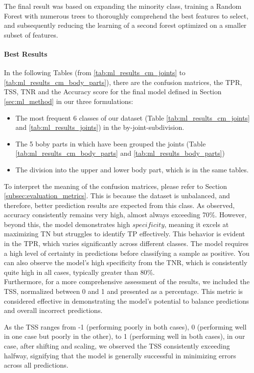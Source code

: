 The final result was based on expanding the minority class, training a Random Forest with numerous trees to thoroughly comprehend the best features to select, and subsequently reducing the learning of a second forest optimized on a smaller subset of features.

\paragraph{Best Results}
In the following Tables (from \ref{tab:ml_results_cm_joints} to \ref{tab:ml_results_cm_body_parts}), there are the confusion matrices, the TPR, TSS, TNR and the Accuracy score for the final model defined in Section \ref{sec:ml_method} in our three formulations:
\begin{itemize}
  \item The most frequent 6 classes of our dataset (Table \ref{tab:ml_results_cm_joints} and \ref{tab:ml_results_joints}) in the by-joint-subdivision.
  \item The 5 boby parts in which have been grouped the joints (Table \ref{tab:ml_results_cm_body_parts} and \ref{tab:ml_results_body_parts})
  \item The division into the upper and lower body part, which is in the same tables.
\end{itemize} 
To interpret the meaning of the confusion matrices, please refer to Section \ref{subsec:evaluation_metrics}.
This is because the dataset is unbalanced, and therefore, better prediction results are expected from this class.
As observed, accuracy consistently remains very high, almost always exceeding 70\%.
However, beyond this, the model demonstrates high $specificity$, meaning it excels at maximizing TN but struggles to identify TP effectively.
This behavior is evident in the TPR, which varies significantly across different classes.
The model requires a high level of certainty in predictions before classifying a sample as positive.
You can also observe the model's high specificity from the TNR, which is consistently quite high in all cases, typically greater than 80\%. \\

Furthermore, for a more comprehensive assessment of the results, we included the TSS, normalized between 0 and 1 and presented as a percentage. 
This metric is considered effective in demonstrating the model's potential to balance predictions and overall incorrect predictions.

As the TSS ranges from -1 (performing poorly in both cases), 0 (performing well in one case but poorly in the other), to 1 (performing well in both cases), in our case, after shifting and scaling, 
we observed the TSS consistently exceeding halfway, signifying that the model is generally successful in minimizing errors across all predictions. 

